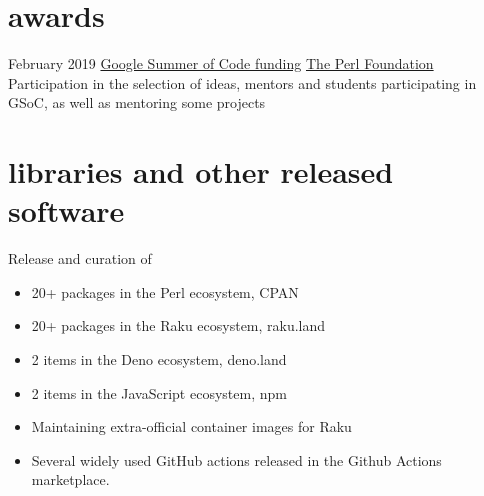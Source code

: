 \documentclass[]{friggeri-jj-cv}
\begin{document}
\section{awards}

\begin{entrylist}
    \entry
    {February 2019}
    {\href{https://summerofcode.withgoogle.com/organizations/4713351599357952/}{Google Summer of Code funding}}
    {\href{https://www.perlfoundation.org/}{The Perl Foundation}}
    {Participation in the selection of ideas, mentors and students
      participating in GSoC, as well as mentoring some projects}

\end{entrylist}


\section{libraries and other released software}

Release and curation of \begin{itemize}
\item 20+ packages in the Perl ecosystem, CPAN
\item 20+ packages in the Raku ecosystem, raku.land
\item 2 items in the Deno ecosystem, deno.land
\item 2 items in the JavaScript ecosystem, npm
\item Maintaining extra-official container images for Raku
\item Several widely used GitHub actions released in the Github Actions marketplace.
\end{itemize}
\end{document}
